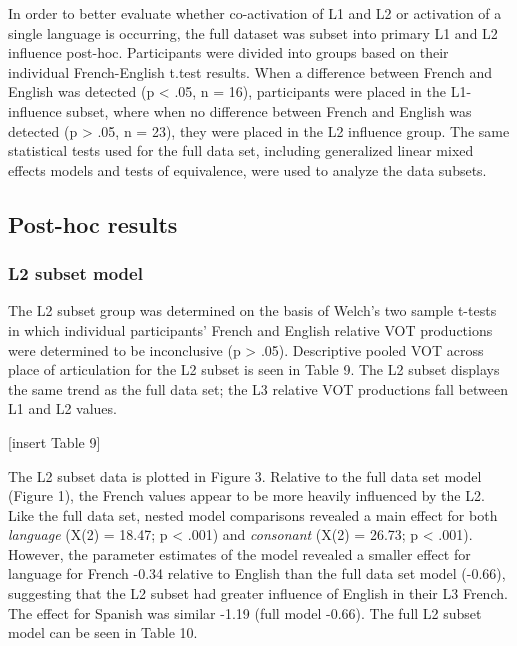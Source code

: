 \documentclass[
  english,
  man]{apa6}
\begin{document}
In order to better evaluate whether co-activation of L1 and L2 or activation of a single language is occurring, the full dataset was subset into primary L1 and L2 influence post-hoc.
Participants were divided into groups based on their individual French-English t.test results.
When a difference between French and English was detected (p \textless{} .05, n = 16), participants were placed in the L1-influence subset, where when no difference between French and English was detected (p \textgreater{} .05, n = 23), they were placed in the L2 influence group.
The same statistical tests used for the full data set, including generalized linear mixed effects models and tests of equivalence, were used to analyze the data subsets.

\hypertarget{post-hoc-results}{%
\subsection{Post-hoc results}\label{post-hoc-results}}

\hypertarget{l2-subset-model}{%
\subsubsection{L2 subset model}\label{l2-subset-model}}

The L2 subset group was determined on the basis of Welch's two sample t-tests in which individual participants' French and English relative VOT productions were determined to be inconclusive (p \textgreater{} .05).
Descriptive pooled VOT across place of articulation for the L2 subset is seen in Table 9. The L2 subset displays the same trend as the full data set; the L3 relative VOT productions fall between L1 and L2 values.

{[}insert Table 9{]}

The L2 subset data is plotted in Figure 3.
Relative to the full data set model (Figure 1), the French values appear to be more heavily influenced by the L2.
Like the full data set, nested model comparisons revealed a main effect for both \emph{language} (X(2) = 18.47; p \textless{} .001) and \emph{consonant} (X(2) = 26.73; p \textless{} .001).
However, the parameter estimates of the model revealed a smaller effect for language for French -0.34 relative to English than the full data set model (-0.66), suggesting that the L2 subset had greater influence of English in their L3 French.
The effect for Spanish was similar -1.19 (full model -0.66). The full L2 subset model can be seen in Table 10.
\end{document}

